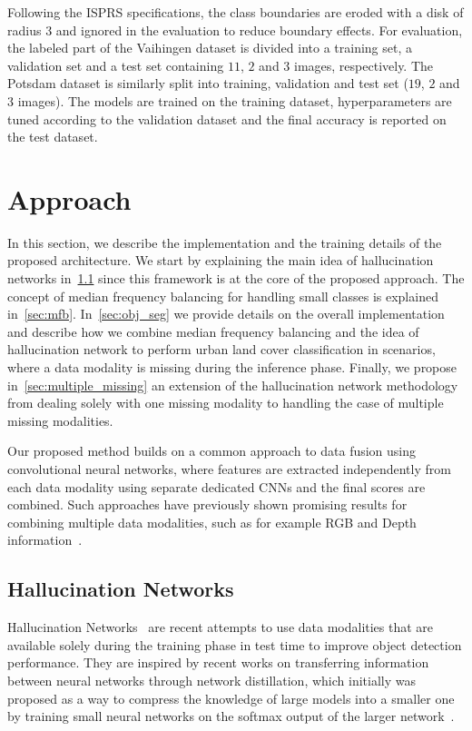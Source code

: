 \documentclass[journal]{IEEEtran}
\begin{document}
Following the ISPRS specifications, the class boundaries are eroded with a disk of radius 3 and ignored in the evaluation to reduce boundary effects.
For evaluation, the labeled part of the Vaihingen dataset is divided into a training set, a validation set and a test set containing $11$, $2$ and $3$ images, respectively. The Potsdam dataset is similarly split into training, validation and test set ($19$, $2$ and $3$ images). The models are trained on the training dataset, hyperparameters are tuned according to the validation dataset and the final accuracy is reported on the test dataset.

\section{Approach}
\label{approach}
In this section, we describe the implementation and the training details of the proposed architecture. We start by explaining the main idea of hallucination networks in~\ref{sec:hal} since this framework is at the core of the proposed approach. The concept of median frequency balancing for handling small classes is explained in~\ref{sec:mfb}. In~\ref{sec:obj_seg} we provide details on the overall implementation and describe how we combine median frequency balancing and the idea of hallucination network to perform urban land cover classification in scenarios, where a data modality is missing during the inference phase. Finally, we propose in~\ref{sec:multiple_missing} an extension of the hallucination network methodology from dealing solely with one missing modality to handling the case of multiple missing modalities.

Our proposed method builds on a common approach to data fusion using convolutional neural networks, where features are extracted independently from each data modality using separate dedicated CNNs and the final scores are combined. Such approaches have previously shown promising results for combining multiple data modalities, such as for example RGB and Depth information~\cite{gupta2014learning, audebert2017fusion}.


\subsection{Hallucination Networks}
\label{sec:hal}
Hallucination Networks~\cite{Hoffman_2016_CVPR} are recent attempts to use data modalities that are available solely during the training phase in test time to improve object detection performance. They are inspired by recent works on transferring information between neural networks through network distillation, which initially was proposed as a way to compress the knowledge of large models into a smaller one by training small neural networks on the softmax output of the larger network~\cite{hinton2015distilling}.
\end{document}
